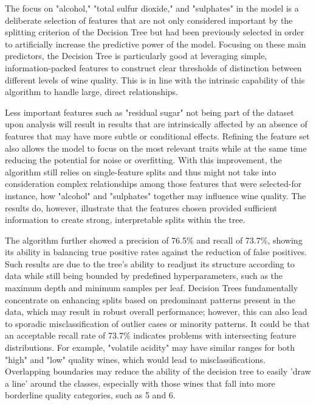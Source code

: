 \documentclass[conference]{IEEEtran}
\begin{document}
The focus on "alcohol," "total sulfur dioxide," and "sulphates" in the model is a deliberate selection of features that are not only considered important by the splitting criterion of the Decision Tree but had been previously selected in order to artificially increase the predictive power of the model. Focusing on these main predictors, the Decision Tree is particularly good at leveraging simple, information-packed features to construct clear thresholds of distinction between different levels of wine quality. This is in line with the intrinsic capability of this algorithm to handle large, direct relationships.

Less important features such as "residual sugar" not being part of the dataset upon analysis will result in results that are intrinsically affected by an absence of features that may have more subtle or conditional effects. Refining the feature set also allows the model to focus on the most relevant traits while at the same time reducing the potential for noise or overfitting. With this improvement, the algorithm still relies on single-feature splits and thus might not take into consideration complex relationships among those features that were selected-for instance, how "alcohol" and "sulphates" together may influence wine quality. The results do, however, illustrate that the features chosen provided sufficient information to create strong, interpretable splits within the tree.

The algorithm further showed a precision of 76.5\% and recall of 73.7\%, showing its ability in balancing true positive rates against the reduction of false positives. Such results are due to the tree's ability to readjust its structure according to data while still being bounded by predefined hyperparameters, such as the maximum depth and minimum samples per leaf. Decision Trees fundamentally concentrate on enhancing splits based on predominant patterns present in the data, which may result in robust overall performance; however, this can also lead to sporadic misclassification of outlier cases or minority patterns. It could be that an acceptable recall rate of 73.7\% indicates problems with intersecting feature distributions. For example, "volatile acidity" may have similar ranges for both "high" and "low" quality wines, which would lead to misclassifications. Overlapping boundaries may reduce the ability of the decision tree to easily 'draw a line' around the classes, especially with those wines that fall into more borderline quality categories, such as 5 and 6.
\end{document}
